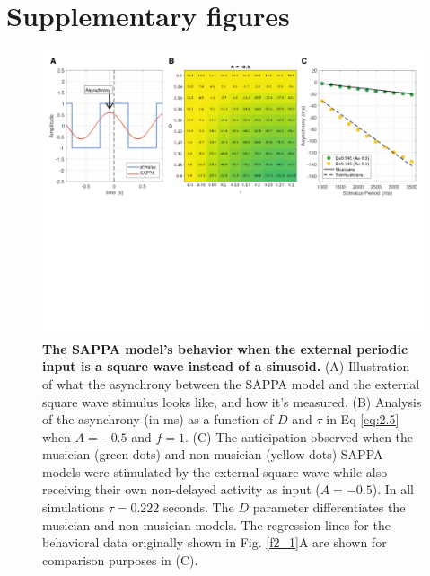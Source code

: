 \documentclass{report}
\begin{document}
\chapter{Supplementary figures}
\begin{figure}
    \centering
    \includegraphics[width=1.0\textwidth]{figures/figS_1.png}
    \caption[The SAPPA model's behavior when the external periodic input is a square wave instead of a sinusoid]{\textbf{The SAPPA model's behavior when the external periodic input is a square wave instead of a sinusoid.} (A) Illustration of what the asynchrony between the SAPPA model and the external square wave stimulus looks like, and how it's measured. (B) Analysis of the asynchrony (in ms) as a function of $D$ and $\tau$ in Eq \eqref{eq:2.5} when $A = -0.5$ and $f = 1$. (C) The anticipation observed when the musician (green dots) and non-musician (yellow dots) SAPPA models were stimulated by the external square wave while also receiving their own non-delayed activity as input ($A = -0.5$). In all simulations $\tau = 0.222$ seconds. The $D$ parameter differentiates the musician and non-musician models. The regression lines for the behavioral data originally shown in Fig.{} \ref{f2_1}A are shown for comparison purposes in (C).}
    \label{fS_1}
\end{figure}
\end{document}
